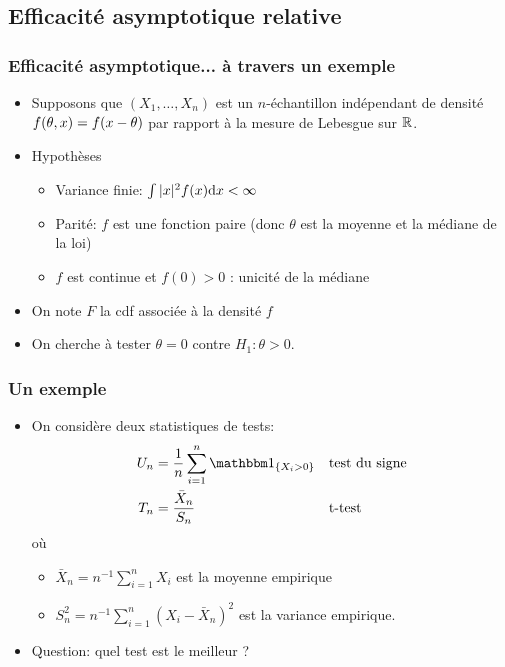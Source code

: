 \subsection{Efficacité asymptotique relative}
\begin{frame}
\frametitle{Efficacité asymptotique... à travers un exemple}
\begin{itemize}
\item Supposons que $(X_1,\dots,X_n)$ est un $n$-échantillon indépendant de densité $f(\theta,x)= f(x-\theta)$ par rapport à la mesure de Lebesgue sur $\mathbb{R}$.
\item \alert{Hypothèses}
\begin{itemize}
\item Variance finie: $\int |x|^2 f(x) \mathrm{d} x < \infty$
\item Parité: $f$ est une fonction paire (donc $\theta$ est la moyenne et la
  médiane de la loi)
\item $f$ est continue et $f(0) > 0$ : unicité de la médiane
\end{itemize}
\item On note $F$ la cdf associée à la densité $f$
\item On cherche à tester $\theta= 0$ contre $H_1: \theta > 0$.
\end{itemize}
\end{frame}


\begin{frame}
\frametitle{Un exemple}
\begin{itemize}
\item On considère deux statistiques de tests:
\begin{align*}
U_n&= \frac{1}{n} \sum_{i=1}^n \indi{X_i > 0} &&\text{test du signe} \\
T_n&= \frac{\bar{X}_n}{S_n}     &&\text{t-test}
\end{align*}
où \begin{itemize}
\item $\bar{X}_n= n^{-1} \sum_{i=1}^n X_i$ est la \alert{moyenne empirique}
\item $S_n^2= n^{-1} \sum_{i=1}^n (X_i - \bar{X}_n)^2$ est la \alert{variance empirique}.
\end{itemize}
\item \alert{Question:} quel test est le meilleur ?
\end{itemize}
\end{frame}

